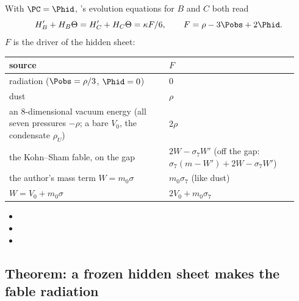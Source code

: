 With $\PC=\Phid$, 's evolution equations for $B$ and $C$ both read
\[
  H_B'+H_B\Theta=H_C'+H_C\Theta=\kappa F/6,\qquad F=\rho-3\Pobs+2\Phid .
\]
$F$ is the driver of the hidden sheet:
\begin{center}
\small
\renewcommand{\arraystretch}{1.3}
\begin{tabular}{@{}>{\raggedright\arraybackslash}p{0.52\linewidth}>{\raggedright\arraybackslash}p{0.42\linewidth}@{}}
\toprule
source & $F$\\
\midrule
radiation ($\Pobs=\rho/3$, $\Phid=0$) & $0$\\
dust & $\rho$\\
an 8-dimensional vacuum energy (all seven pressures $-\rho$; a bare $V_0$, the condensate $\rho_U$) & $2\rho$\\
the Kohn--Sham fable, on the gap & $2W-\sigma_7W'$ (off the gap: $\sigma_7(m-W')+2W-\sigma_7W'$)\\
the author's mass term $W=m_0\sigma$ & $m_0\sigma_7$ (like dust)\\
$W=V_0+m_0\sigma$ & $2V_0+m_0\sigma_7$\\
\bottomrule
\end{tabular}
\end{center}
\begin{itemize}
  \item {}
  \item {}
  \item {}
\end{itemize}

\subsection{Theorem: a frozen hidden sheet makes the fable radiation}
\label{sec:7.7}

